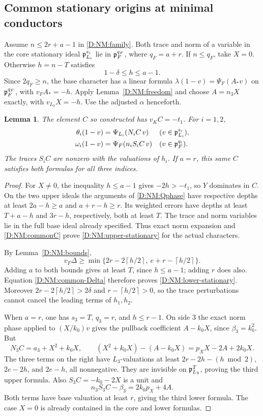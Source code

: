 \documentclass[11pt]{amsart}
\newtheorem{lemma}[theorem]{Lemma}
\theoremstyle{definition}
\theoremstyle{remark}
\newcommand{\ceil}[1]{\left\lceil #1\right\rceil}
\begin{document}
\subsection{Common stationary origins at minimal conductors}
Assume $n\le2r+a-1$ in \eqref{D:NM:family}. Both trace and norm of a variable
in the core stationary ideal $\mathfrak p_{L_i}^{s_i}$ lie in
$\mathfrak p_F^{q_F}$, where $q_F=a+r$. If $n\le q_F$, take $X=0$.
Otherwise $h=n-T$ satisfies
\begin{equation}\label{D:NM:minimal-h}
 1-\delta\le h\le a-1.
\end{equation}
Since $2q_F\ge n$, the base character has a linear formula
$\lambda(1-v)=\Psi_F(A_*v)$ on $\mathfrak p_F^{q_F}$, with $v_FA_*=-h$.
Apply Lemma~\ref{D:NM:freedom} and choose $A=n_3X$ exactly, with
$v_{L_3}X=-h$. Use the adjusted $\alpha$ henceforth.

\begin{lemma}\label{D:NM:minimal-origin}
The element $C$ so constructed has $v_KC=-t_1$. For $i=1,2$,
\begin{align}
 \theta_i(1-v)&=\Psi_{L_i}(N_iC\,v)
                              &&(v\in\mathfrak p_{L_i}^{s_i}),  \label{D:NM:upper-stationary}\\
 \omega_i(1-v)&=\Psi_F(n_iS_iC\,v)
                              &&(v\in\mathfrak p_F^{q_i}).      \label{D:NM:lower-stationary}
\end{align}
The traces $S_iC$ are nonzero with the valuations of $h_i$.
If $a=r$, this same $C$ satisfies both formulas for all three indices.
\end{lemma}
\begin{proof}
For $X\ne0$, the inequality $h\le a-1$ gives $-2h>-t_1$, so $Y$
dominates in $C$. On the two upper ideals the arguments of
\eqref{D:NM:Qphase} have respective depths at least $2a-h\ge a$ and
$a+r-h\ge r$. Its weighted errors have depths at least
$T+a-h$ and $3r-h$, respectively, both at least $T$.
The trace and norm variables lie in the full base ideal already specified.
Thus exact norm expansion and \eqref{D:NM:commonC} prove
\eqref{D:NM:upper-stationary} for the actual characters.

By Lemma~\ref{D:NM:bounds},
\[
 v_F\Delta\ge\min\{2r-2\ceil{h/2},\ e+r-\ceil{h/2}\}.
\]
Adding $a$ to both bounds gives at least $T$, since $h\le a-1$;
adding $r$ does also. Equation \eqref{D:NM:common-Delta} therefore proves
\eqref{D:NM:lower-stationary}. Moreover
$2r-2\ceil{h/2}>2\delta$ and $r-\ceil{h/2}>0$, so the trace
perturbations cannot cancel the leading terms of $h_1,h_2$.

When $a=r$, one has $s_3=T$, $q_3=r$, and $h\le r-1$.
On side 3 the exact norm phase applied to $(X/k_0)v$ gives the
pullback coefficient $A-k_0X$, since $\beta_3=k_0^2$.
But
\[
 N_3C=a_3+X^2+k_0X,
 \qquad (X^2+k_0X)-(A-k_0X)=p_XX-2A+2k_0X.
\]
The three terms on the right have $L_3$-valuations at least
$2r-2h-(h\bmod2)$, $2e-2h$, and $2e-h$, all nonnegative.
They are invisible on $\mathfrak p_{L_3}^{T}$, proving the third upper formula.
Also $S_3C=-k_0-2X$ is a unit and
\[
 n_3S_3C-\beta_3=2k_0p_X+4A.
\]
Both terms have base valuation at least $r$, giving the third lower
formula. The case $X=0$ is already contained in the core and lower
formulas.
\end{proof}
\end{document}
